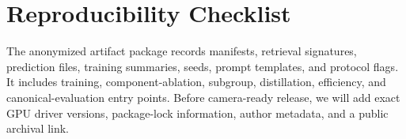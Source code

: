\documentclass[11pt]{article}
\begin{document}
\section{Reproducibility Checklist}
The anonymized artifact package records manifests, retrieval signatures, prediction files, training summaries, seeds, prompt templates, and protocol flags. It includes training, component-ablation, subgroup, distillation, efficiency, and canonical-evaluation entry points. Before camera-ready release, we will add exact GPU driver versions, package-lock information, author metadata, and a public archival link.
\end{document}
